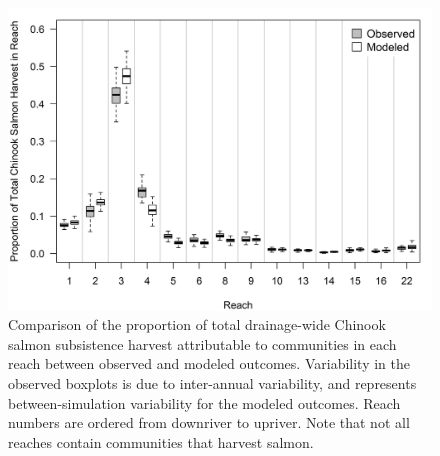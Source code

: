 \documentclass[12pt,]{book}
\theoremstyle{definition}
\theoremstyle{definition}
\theoremstyle{definition}
\theoremstyle{remark}
\begin{document}
\clearpage

\begin{figure}
  \centering
  \includegraphics{img/Ch3/Figure B4.jpg}
  \caption{Comparison of the proportion of total drainage-wide Chinook salmon subsistence harvest attributable to communities in each reach between observed and modeled outcomes. Variability in the observed boxplots is due to inter-annual variability, and represents between-simulation variability for the modeled outcomes. Reach numbers are ordered from downriver to upriver. Note that not all reaches contain communities that harvest salmon.}
  \label{fig:spatial-harvest}
\end{figure}


\end{document}
